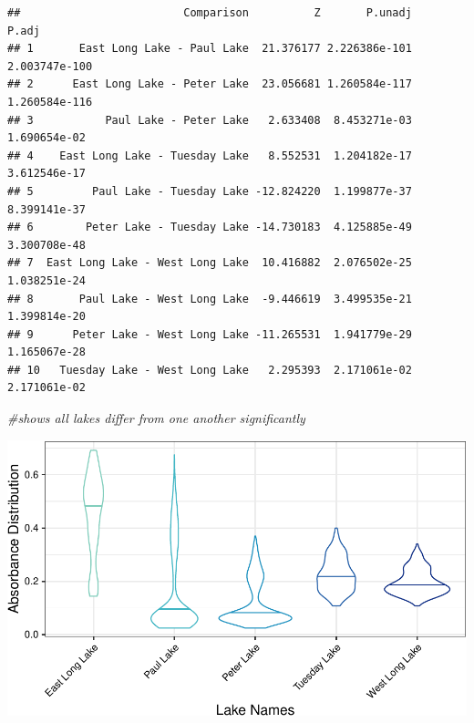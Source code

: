 \documentclass[12pt,]{article}
\newenvironment{Shaded}{\begin{snugshade}}{\end{snugshade}}
\newcommand{\KeywordTok}[1]{\textcolor[rgb]{0.13,0.29,0.53}{\textbf{#1}}}
\newcommand{\StringTok}[1]{\textcolor[rgb]{0.31,0.60,0.02}{#1}}
\newcommand{\CommentTok}[1]{\textcolor[rgb]{0.56,0.35,0.01}{\textit{#1}}}
\newcommand{\OperatorTok}[1]{\textcolor[rgb]{0.81,0.36,0.00}{\textbf{#1}}}
\newcommand{\NormalTok}[1]{#1}
\begin{document}
\begin{Shaded}
\end{Shaded}

\begin{verbatim}
##                         Comparison          Z       P.unadj         P.adj
## 1       East Long Lake - Paul Lake  21.376177 2.226386e-101 2.003747e-100
## 2      East Long Lake - Peter Lake  23.056681 1.260584e-117 1.260584e-116
## 3           Paul Lake - Peter Lake   2.633408  8.453271e-03  1.690654e-02
## 4    East Long Lake - Tuesday Lake   8.552531  1.204182e-17  3.612546e-17
## 5         Paul Lake - Tuesday Lake -12.824220  1.199877e-37  8.399141e-37
## 6        Peter Lake - Tuesday Lake -14.730183  4.125885e-49  3.300708e-48
## 7  East Long Lake - West Long Lake  10.416882  2.076502e-25  1.038251e-24
## 8       Paul Lake - West Long Lake  -9.446619  3.499535e-21  1.399814e-20
## 9      Peter Lake - West Long Lake -11.265531  1.941779e-29  1.165067e-28
## 10   Tuesday Lake - West Long Lake   2.295393  2.171061e-02  2.171061e-02
\end{verbatim}

\begin{Shaded}
\begin{Highlighting}[]
\CommentTok{#shows all lakes differ from one another significantly }
\end{Highlighting}
\end{Shaded}

\includegraphics{Bash_ENV872_Project_files/figure-latex/vio-1.pdf}
\newpage
\end{document}

